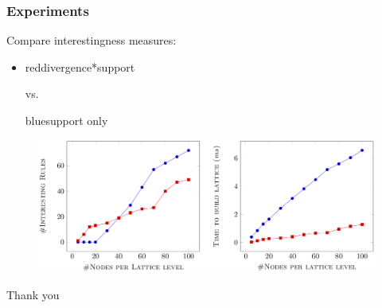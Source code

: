 \documentclass{beamer}
\begin{document}
\begin{frame}
\frametitle{Experiments}
 Compare interestingness measures:
 \begin{itemize}
  \item \begin{color}{red}divergence*support\end{color} vs. \begin{color}{blue}support only\end{color}
 \end{itemize}
 \begin{figure}
  \includegraphics[height=0.5\textheight]{./Figures/plots}
 \end{figure}
\end{frame}
\begin{frame}
\Huge{\centerline{Thank you}}
\end{frame}
\end{document}
